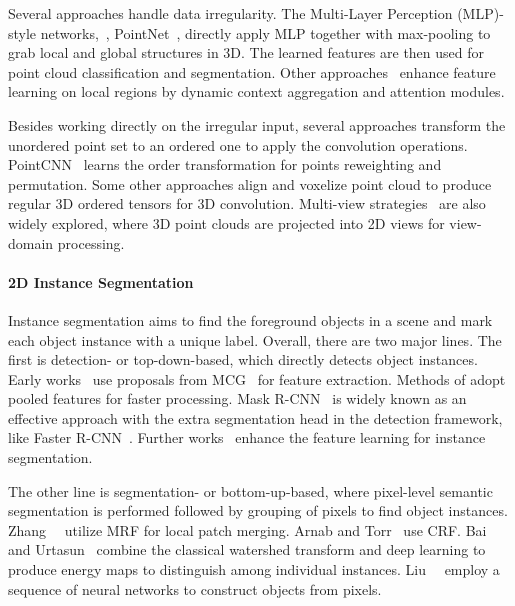 \documentclass[10pt,twocolumn,letterpaper]{article}
\begin{document}
Several approaches handle data irregularity.
The Multi-Layer Perception (MLP)-style networks,~\eg, PointNet~\cite{qi2017pointnet,qi2017pointnet2}, directly apply MLP together with max-pooling to grab local and global structures in 3D. The learned features are then used for point cloud classification and segmentation.
Other approaches~\cite{dgcnn,wang2018pccn,zhao2019pointweb,wu2019pointconv,jiang2019hierarchical} enhance feature learning on local regions by dynamic context aggregation and attention modules. 

Besides working directly on the irregular input, several approaches transform the unordered point set to an ordered one to apply the convolution operations. PointCNN~\cite{pointcnn} learns the order transformation for points reweighting and permutation.
Some other approaches  \cite{maturana2015voxnet,song2016ssc,tchapmi2017segcloud,riegler2017octnet,graham20183d,choy20194d} align and voxelize point cloud to produce regular 3D ordered tensors for 3D convolution.
Multi-view strategies~\cite{qi2016volumetric, su15mvcnn, su20153dassisted} are also widely explored, where 3D point clouds are projected into 2D views for view-domain processing.

\vspace*{-3mm}
\paragraph{2D Instance Segmentation}
Instance segmentation aims to find the foreground objects in a scene and mark each object instance with a unique label.
Overall, there are two major lines.
The first is detection- or top-down-based, which directly detects object instances.
Early works~\cite{hariharan2014simultaneous,hariharan2015hypercolumns} use proposals from MCG~\cite{arbelaez2014multiscale} for feature extraction. Methods of \cite{dai2015convolutional,dai2016instance,hayder2017boundary} adopt pooled features for faster processing. 
Mask R-CNN~\cite{he2017mask} is widely known as an effective approach with the extra segmentation head in the detection framework, like Faster R-CNN~\cite{ren2015faster}.
Further works~\cite{liu2018path,chen2018masklab,chen2019hybrid} enhance the feature learning for instance segmentation.

The other line is segmentation- or bottom-up-based, where pixel-level semantic segmentation is performed followed by grouping of pixels to find object instances. 
Zhang~\etal~\cite{zhang2015monocular,zhang2016instance} utilize MRF for local patch merging.
Arnab and Torr~\cite{arnab2017pixelwise} use CRF.
Bai and Urtasun~\cite{bai2017deep} combine the classical watershed transform and deep learning to produce energy maps to distinguish among individual instances. Liu~\etal~\cite{liu2017sgn} employ a sequence of neural networks to construct objects from pixels.
\end{document}
